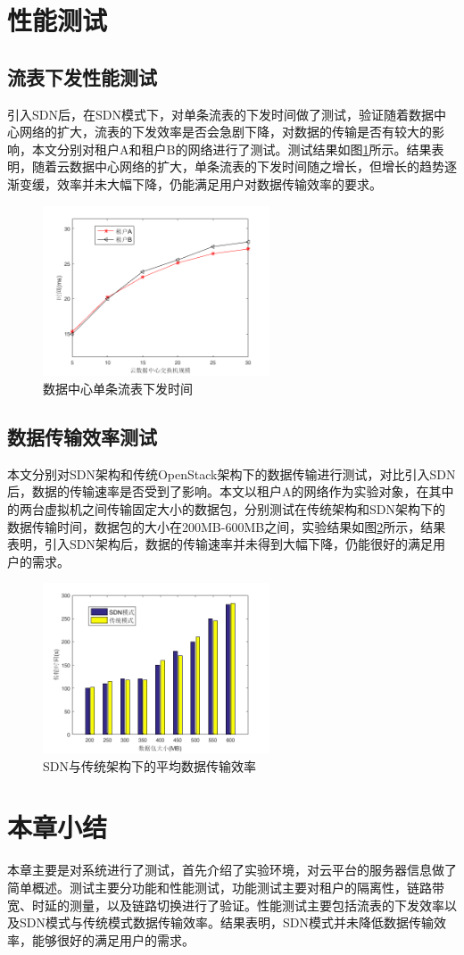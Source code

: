 \section{性能测试}
\subsection{流表下发性能测试}
引入SDN后，在SDN模式下，对单条流表的下发时间做了测试，验证随着数据中心网络的扩大，流表的下发效率是否会急剧下降，对数据的传输是否有较大的影响，本文分别对租户A和租户B的网络进行了测试。测试结果如图\ref{fig:flow-time}所示。结果表明，随着云数据中心网络的扩大，单条流表的下发时间随之增长，但增长的趋势逐渐变缓，效率并未大幅下降，仍能满足用户对数据传输效率的要求。

\begin{figure}[!htb]
  \centering
  \includegraphics[width=0.6\textwidth,height=0.40\textwidth]{logo/flow-time}
  \caption{数据中心单条流表下发时间}
  \label{fig:flow-time}
\end{figure}
\subsection{数据传输效率测试}
本文分别对SDN架构和传统OpenStack架构下的数据传输进行测试，对比引入SDN后，数据的传输速率是否受到了影响。本文以租户A的网络作为实验对象，在其中的两台虚拟机之间传输固定大小的数据包，分别测试在传统架构和SDN架构下的数据传输时间，数据包的大小在200MB-600MB之间，实验结果如图\ref{fig:transmission}所示，结果表明，引入SDN架构后，数据的传输速率并未得到大幅下降，仍能很好的满足用户的需求。
\begin{figure}[!htb]
  \centering
  \includegraphics[width=0.6\textwidth,height=0.40\textwidth]{logo/transmission}
  \caption{SDN与传统架构下的平均数据传输效率}
  \label{fig:transmission}
\end{figure}
\section{本章小结}
本章主要是对系统进行了测试，首先介绍了实验环境，对云平台的服务器信息做了简单概述。测试主要分功能和性能测试，功能测试主要对租户的隔离性，链路带宽、时延的测量，以及链路切换进行了验证。性能测试主要包括流表的下发效率以及SDN模式与传统模式数据传输效率。结果表明，SDN模式并未降低数据传输效率，能够很好的满足用户的需求。